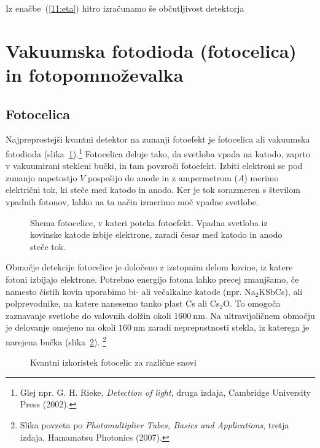Iz enačbe~(\ref{11:eta}) hitro izračunamo še občutljivost detektorja 

\section{Vakuumska fotodioda (fotocelica) in fotopomnoževalka}
\subsection*{Fotocelica}
Najpreprostejši kvantni detektor na zunanji fotoefekt je fotocelica ali vakuumska fotodioda
(slika~\ref{fig:Fotoefekt}).\footnote{Glej npr. G. H. Rieke, {\it Detection 
of light}, druga izdaja, Cambridge University Press (2002).} 
Fotocelica deluje tako, da svetloba vpada na katodo, 
zaprto v vakuumirani stekleni bučki, in tam povzroči fotoefekt. Izbiti elektroni 
se pod zunanjo napetostjo $V$ pospešijo do anode in z ampermetrom ($A$) 
merimo električni tok, ki steče med katodo in anodo. 
Ker je tok sorazmeren s številom vpadnih fotonov, lahko na ta 
način izmerimo moč vpadne svetlobe.

\begin{figure}[h]
\centering
\def\svgwidth{60truemm} 

\caption{Shema fotocelice, v kateri poteka fotoefekt. 
Vpadna svetloba iz kovinske katode izbije elektrone, zaradi česar med katodo 
in anodo steče tok.}
\label{fig:Fotoefekt}
\end{figure}

Območje detekcije fotocelice je določeno z izstopnim delom kovine, iz 
katere fotoni izbijajo elektrone. Potrebno energijo fotona lahko precej zmanjšamo, 
če namesto čistih kovin uporabimo bi- ali večalkalne katode 
(npr. Na$_2$KSbCs), ali polprevodnike, na katere nanesemo tanko plast 
Cs ali Cs$_2$O. To omogoča zaznavanje svetlobe do valovnih dolžin okoli $1600~\si{\nano\metre}$. 
Na ultravijoličnem območju je delovanje
omejeno na okoli $160~\si{\nano\metre}$ zaradi neprepustnosti stekla, 
iz katerega je narejena bučka 
(slika~\ref{fig:Fotodioda}).
\footnote{Slika povzeta po {\it Photomultiplier Tubes, Basics and Applications}, tretja izdaja, Hamamatsu
Photonics (2007).}
\begin{figure}[h]
\centering
\def\svgwidth{130truemm} 

\caption{Kvantni izkoristek fotocelic za različne snovi}
\label{fig:Fotodioda}
\end{figure}

